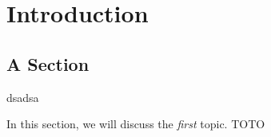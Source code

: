 \chapter{Introduction}

\section{A Section}

 dsadsa

In this section, we will discuss the \emph{first} topic.
TOTO
